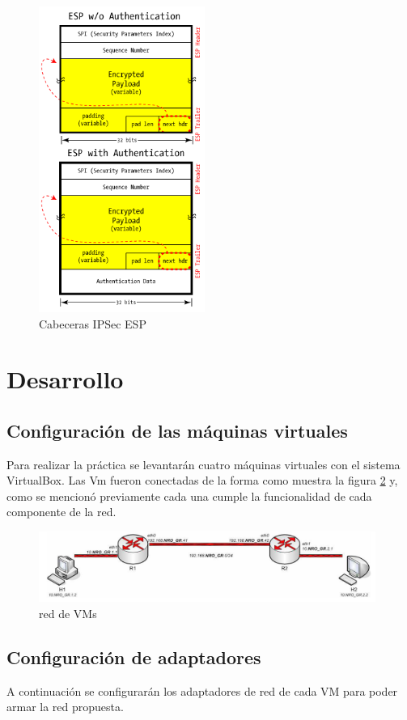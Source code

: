 \documentclass[a4paper,10pt]{article}
\begin{document}
	\begin{figure}[!htb]
		\centering
		\includegraphics[height=10cm]{Imagenes/protocoloEsp.png}
		\caption{Cabeceras IPSec ESP} \label{img004}
	\end{figure}	

	

	\newpage
	\section{Desarrollo}
		\subsection{Configuración de las máquinas virtuales}

	\indent Para realizar la práctica se levantarán cuatro máquinas virtuales con el sistema VirtualBox. 
	\indent Las Vm fueron conectadas de la forma como muestra la figura \ref{img005} y, como se mencionó previamente cada una cumple la funcionalidad de cada componente de la red.

	
	\begin{figure}[!htb]
		\centering
		\includegraphics[width=11cm]{Imagenes/red.png}
		\caption{red de VMs} \label{img005}
	\end{figure}
	
		\subsection{Configuración de adaptadores}
	\indent A continuaci\'on se configurar\'an los adaptadores de red de cada VM para poder armar la red propuesta.	
\end{document}
